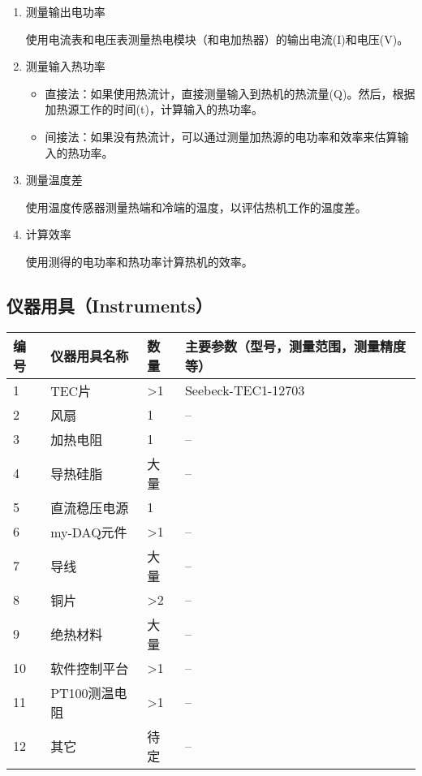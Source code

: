\documentclass[dvipsnames, svgnames,a4paper,11pt]{article}
\begin{document}
	\begin{enumerate}
		\item 测量输出电功率
		
		使用电流表和电压表测量热电模块（和电加热器）的输出电流(I)和电压(V)。 
		
		\item 测量输入热功率
		\begin{itemize}
			\item 直接法：如果使用热流计，直接测量输入到热机的热流量(Q)。然后，根据加热源工作的时间(t)，计算输入的热功率。
			\item 间接法：如果没有热流计，可以通过测量加热源的电功率和效率来估算输入的热功率。
		\end{itemize}
		
		\item 测量温度差
		
		使用温度传感器测量热端和冷端的温度，以评估热机工作的温度差。
		
		\item 计算效率
		
		使用测得的电功率和热功率计算热机的效率。
		
	\end{enumerate}
	
	\clearpage
	\subsection{仪器用具（Instruments）}
		\begin{table}[htbp]
			\centering
			\renewcommand\arraystretch{1.6}
			\begin{tabular}{p{}|p{}|p{}|p{}}
				\hline
				编号& 仪器用具名称 & 数量 &  主要参数（型号，测量范围，测量精度等） \\
				\hline
				1& TEC片 & >1 & Seebeck-TEC1-12703 \\
				2& 风扇 & 1 & -- \\
				3& 加热电阻 & 1 & -- \\
				4& 导热硅脂 & 大量 & -- \\
				5& 直流稳压电源 & 1 &  \\
				6& my-DAQ元件 & >1 & -- \\
				7& 导线 & 大量 & -- \\
				8& 铜片 & >2 & -- \\
				9& 绝热材料 & 大量 & -- \\
				10& 软件控制平台 & >1 & -- \\
				11& PT100测温电阻 & >1 & -- \\
				12& 其它 & 待定 & -- \\
				\hline
			\end{tabular}
		\end{table}
	
\end{document}
